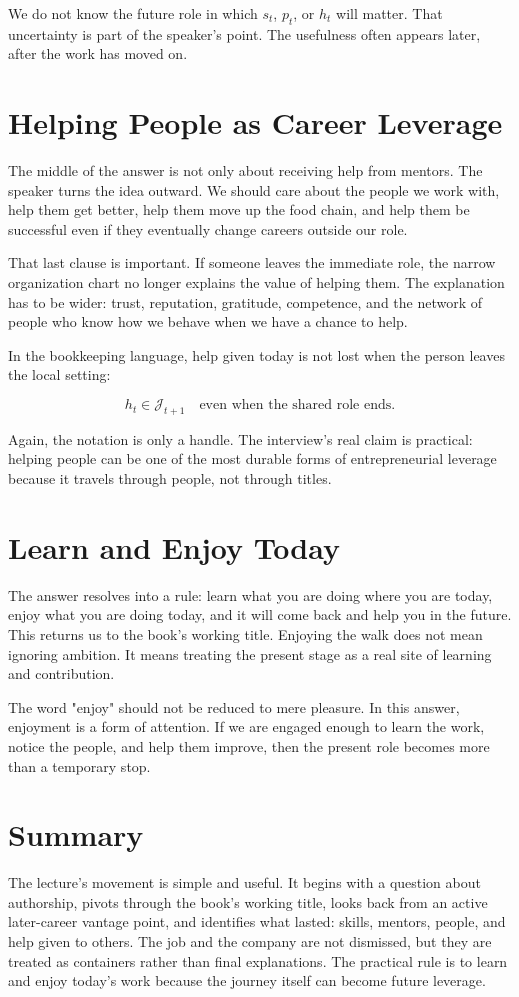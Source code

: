 We do not know the future role in which \(s_t\), \(p_t\), or \(h_t\) will matter. That uncertainty is part of the speaker's point. The usefulness often appears later, after the work has moved on.

\section{Helping People as Career Leverage}

The middle of the answer is not only about receiving help from mentors. The speaker turns the idea outward. We should care about the people we work with, help them get better, help them move up the food chain, and help them be successful even if they eventually change careers outside our role.

That last clause is important. If someone leaves the immediate role, the narrow organization chart no longer explains the value of helping them. The explanation has to be wider: trust, reputation, gratitude, competence, and the network of people who know how we behave when we have a chance to help.

In the bookkeeping language, help given today is not lost when the person leaves the local setting:

\begin{equation}
h_t \in \mathcal{J}_{t+1}
\quad\text{even when the shared role ends.}
\end{equation}

Again, the notation is only a handle. The interview's real claim is practical: helping people can be one of the most durable forms of entrepreneurial leverage because it travels through people, not through titles.

\section{Learn and Enjoy Today}

The answer resolves into a rule: learn what you are doing where you are today, enjoy what you are doing today, and it will come back and help you in the future. This returns us to the book's working title. Enjoying the walk does not mean ignoring ambition. It means treating the present stage as a real site of learning and contribution.

The word "enjoy" should not be reduced to mere pleasure. In this answer, enjoyment is a form of attention. If we are engaged enough to learn the work, notice the people, and help them improve, then the present role becomes more than a temporary stop.

\section{Summary}

The lecture's movement is simple and useful. It begins with a question about authorship, pivots through the book's working title, looks back from an active later-career vantage point, and identifies what lasted: skills, mentors, people, and help given to others. The job and the company are not dismissed, but they are treated as containers rather than final explanations. The practical rule is to learn and enjoy today's work because the journey itself can become future leverage.